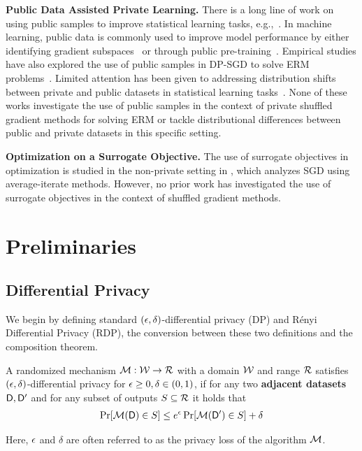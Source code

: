 \textbf{Public Data Assisted Private Learning. }
There is a long line of work on using public samples to improve statistical learning tasks, e.g.,~\cite{bassily20priv_query_release_pub_data, block2024oracleefficient_dp_learning, ullah2024public_data_priv_sco}.
In machine learning, public data is commonly used to improve model performance by either identifying gradient subspaces~\cite{zhou2021bypassing, kairouz2021priv_erm_pub_subspace} or through public pre-training~\cite{yu2022dp_fine_tune_lm, bu2023dp_fine_tune_fm}.
Empirical studies have also explored the use of public samples in DP-SGD to solve ERM problems~\cite{Wang2020dp_small_pub_data}.
Limited attention has been given to addressing distribution shifts between private and public datasets in statistical learning tasks~\cite{bie2022private_est_pub_data_shift, Bassily2023priv_adp_from_pub_source}.
None of these works investigate the use of public samples in the context of private shuffled gradient methods for solving ERM or tackle distributional differences between public and private datasets in this specific setting.

\textbf{Optimization on a Surrogate Objective.}
The use of surrogate objectives in optimization is studied in the non-private setting in \cite{Woodworth2023two_losses},
which analyzes SGD using average-iterate methods.
However, no prior work has investigated the use of surrogate objectives in the context of shuffled gradient methods.






\section{Preliminaries}
\label{sec:appendix_prelim}


\subsection{Differential Privacy}
\label{subsec:appendix_dp_related}

We begin by defining standard $({\epsilon},\delta)$-differential privacy (DP) and Rényi Differential Privacy (RDP), the conversion between these two definitions and the composition theorem. 

\begin{definition}
\label{def:appendix_DP}
    A randomized mechanism ${\mathcal{M}}: {\mathcal{W}} \rightarrow {\mathcal{R}}$ with a domain ${\mathcal{W}}$ and range ${\mathcal{R}}$ satisfies $({\epsilon}, \delta)$-differential privacy for ${\epsilon} \geq 0, \delta \in (0, 1) $, if for any two {\bf adjacent datasets} ${\mathsf{D}}, {\mathsf{D}}'$ 
    and for any subset of outputs $S \subseteq {\mathcal{R}}$ it holds that 
    \begin{align*}
        \Pr[{\mathcal{M}}({\mathsf{D}}) \in S] \leq e^{{\epsilon}} \Pr[{\mathcal{M}}({\mathsf{D}}') \in S] + \delta
    \end{align*}
\end{definition}
Here, ${\epsilon}$ and $\delta$ are often referred to as the privacy loss of the algorithm ${\mathcal{M}}$.

